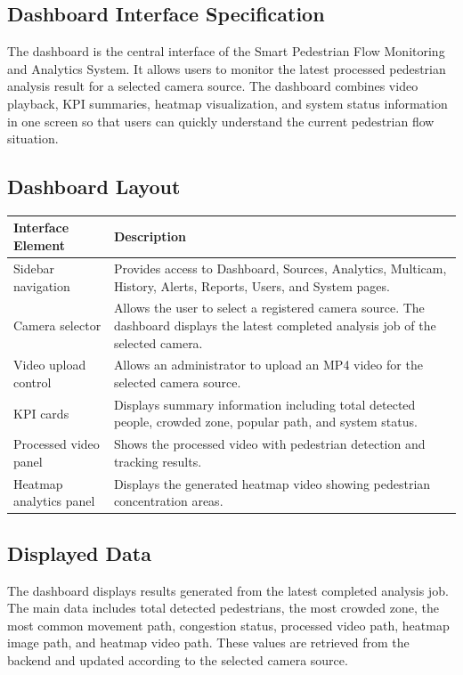 \documentclass[12pt,a4paper]{report}
\begin{document}
\subsection{Dashboard Interface Specification}

The dashboard is the central interface of the Smart Pedestrian Flow Monitoring and Analytics System. It allows users to monitor the latest processed pedestrian analysis result for a selected camera source. The dashboard combines video playback, KPI summaries, heatmap visualization, and system status information in one screen so that users can quickly understand the current pedestrian flow situation.

\subsection{Dashboard Layout}

\begin{longtable}{|p{4cm}|p{10cm}|}
\hline
\rowcolor{HeaderBlue}
\textbf{Interface Element} & \textbf{Description} \\
\hline
Sidebar navigation & Provides access to Dashboard, Sources, Analytics, Multicam, History, Alerts, Reports, Users, and System pages. \\
\hline
Camera selector & Allows the user to select a registered camera source. The dashboard displays the latest completed analysis job of the selected camera. \\
\hline
Video upload control & Allows an administrator to upload an MP4 video for the selected camera source. \\
\hline
KPI cards & Displays summary information including total detected people, crowded zone, popular path, and system status. \\
\hline
Processed video panel & Shows the processed video with pedestrian detection and tracking results. \\
\hline
Heatmap analytics panel & Displays the generated heatmap video showing pedestrian concentration areas. \\
\hline
\end{longtable}

\subsection{Displayed Data}

The dashboard displays results generated from the latest completed analysis job. The main data includes total detected pedestrians, the most crowded zone, the most common movement path, congestion status, processed video path, heatmap image path, and heatmap video path. These values are retrieved from the backend and updated according to the selected camera source.
\end{document}
